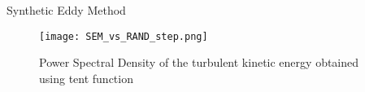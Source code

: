 \begin{frame}{Synthetic Eddy Method}
    \begin{figure}
        \centering
        \texttt{[image: SEM\_vs\_RAND\_step.png]}
        \caption{Power Spectral Density of the turbulent kinetic energy obtained using tent function}
\end{figure} 
\end{frame}
